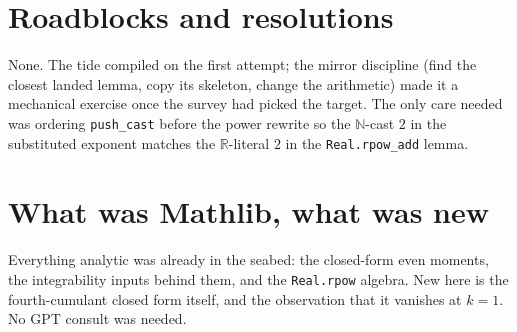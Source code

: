 \documentclass[11pt]{article}
\begin{document}
\section{Roadblocks and resolutions}
None. The tide compiled on the first attempt; the mirror discipline (find the closest landed lemma,
copy its skeleton, change the arithmetic) made it a mechanical exercise once the survey had picked
the target. The only care needed was ordering \texttt{push\_cast} before the power rewrite so the
$\mathbb{N}$-cast $2$ in the substituted exponent matches the $\mathbb{R}$-literal $2$ in the
\texttt{Real.rpow\_add} lemma.
\section{What was Mathlib, what was new}
Everything analytic was already in the seabed: the closed-form even moments, the integrability
inputs behind them, and the \texttt{Real.rpow} algebra. New here is the fourth-cumulant closed form
itself, and the observation that it vanishes at $k=1$. No GPT consult was needed.
\end{document}
